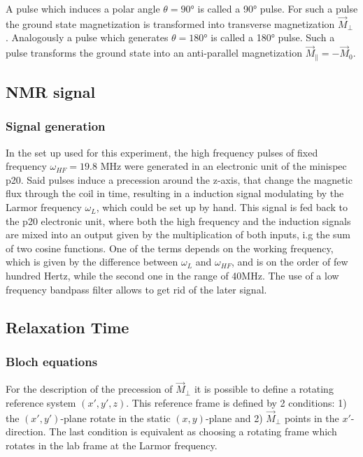 A pulse which induces a  polar angle $\theta = 90$° is called a 90° pulse. For such a pulse the ground state magnetization is transformed into transverse magnetization $\vec{M}_{\perp}$%
. Analogously a pulse which generates $\theta = 180°$ is called a 180° pulse. Such a pulse transforms the ground state into an anti-parallel magnetization $\vec{M}_{\parallel} = -\vec{M}_0$. %
\subsection{NMR signal}
\subsubsection{Signal generation}
In the set up used for this experiment, the high frequency pulses of fixed frequency $\omega_{HF} = 19.8$ MHz were generated in an electronic unit of the minispec p20. Said pulses induce a precession around the z-axis, that change the magnetic flux through the coil in time, resulting in a induction signal modulating by the Larmor frequency $\omega_L$, which could be set up by hand. This signal is fed back to the p20 electronic unit, where both the high frequency and the induction signals are mixed into an output given by the multiplication of both inputs, i.g the sum of two cosine functions. One of the terms depends on the working frequency, which is given by the difference between $\omega_L$ and $\omega_{HF}$, and is on the order of few hundred Hertz, while the second one in the range of 40MHz. The use of a low frequency bandpass filter allows to get rid of the later signal.   
\subsection{Relaxation Time}
\subsubsection{Bloch equations}
For the description of the precession of $\vec{M}_{\perp}$ it is possible to define a rotating reference system $(x', y', z)$. This reference frame is defined by 2 conditions: 1) the $(x', y')$-plane rotate in the static $(x, y)$-plane and 2) $\vec{M}_{\perp}$ points in the $x'$-direction. The last condition is equivalent as choosing a rotating frame which rotates in the lab frame at the Larmor frequency. 

